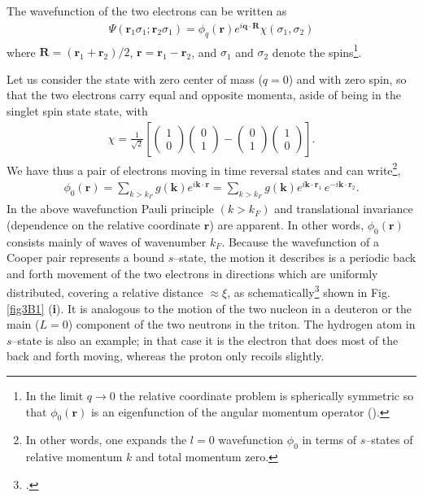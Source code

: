 \begin{subappendices}
The wavefunction of the two electrons can be written as
\begin{align}\label{eq3B1}
\Psi(\mathbf r_1\sigma_1;\mathbf r_2\sigma_1)=\phi_q(\mathbf r)e^{i\mathbf q\cdot\mathbf R}\chi(\sigma_1,\sigma_2)
\end{align}
where $\mathbf R=(\mathbf r_1+\mathbf r_2)/2$, $\mathbf r=\mathbf r_1-\mathbf r_2$, and $\sigma_1$ and $\sigma_2$ denote the spins\footnote{In the limit $q\rightarrow 0$ the relative coordinate problem is spherically symmetric so that $\phi_0(\mathbf r)$ is an eigenfunction of the angular momentum operator (\cite{Schrieffer:64}).}. 


Let us consider the state with zero center of mass ($q=0$) and with zero spin, so that the two electrons carry  equal and opposite momenta, aside of being in the singlet spin state state, with
\begin{align}\label{eq3B2}
\chi=\frac{1}{\sqrt{2}}\left[
\left(\begin{array}{c}
1\\ 
0
\end{array} \right)
\left(\begin{array}{c}
0\\ 
1
\end{array} \right)-
\left(\begin{array}{c}
0\\ 
1
\end{array} \right)
\left(\begin{array}{c}
1\\ 
0
\end{array} \right)
\right].
\end{align}
 We have thus a pair of electrons moving in time reversal states and can write\footnote{In other words, one expands the $l=0$ wavefunction $\phi_0$ in terms of $s$--states of relative momentum $k$ and total momentum zero.},
\begin{align}\label{eq3B3}
\phi_0(\mathbf r)=\sum_{k>k_F}g(\mathbf k)e^{i\mathbf k\cdot\mathbf r}=\sum_{k>k_F}g(\mathbf k)e^{i\mathbf k\cdot\mathbf r_1}\,e^{-i\mathbf k\cdot\mathbf r_2}.
\end{align}
In the above wavefunction Pauli principle $(k>k_F)$ and translational invariance (dependence on the relative coordinate $\mathbf r$) are apparent. 
In other words, $\phi_0(\mathbf r)$ consists mainly of waves of wavenumber $k_F$. Because the wavefunction of a Cooper pair represents a bound $s$--state, the motion it describes is a periodic back and forth movement of the two electrons in  directions which are uniformly distributed, covering a relative distance $\approx\xi$, as schematically\footnote{\cite{Weisskopf:81}.} shown in Fig. \ref{fig3B1} (\textbf{i}). It is analogous to the motion of the two nucleon in a deuteron or the main ($L=0$) component of the two neutrons in the triton. The hydrogen atom in $s$--state is also an example; in that case it is the electron that does most of the back and forth moving, whereas the proton only recoils slightly.


\end{subappendices}
